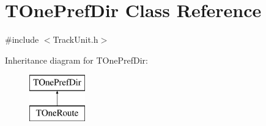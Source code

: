 \hypertarget{class_t_one_pref_dir}{}\section{T\+One\+Pref\+Dir Class Reference}
\label{class_t_one_pref_dir}


{\ttfamily \#include $<$Track\+Unit.\+h$>$}

Inheritance diagram for T\+One\+Pref\+Dir\+:\begin{figure}[H]
\begin{center}
\leavevmode
\includegraphics[height=2.000000cm]{class_t_one_pref_dir}
\end{center}
\end{figure}
